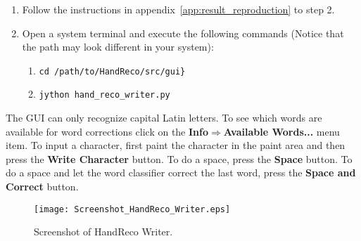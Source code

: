 \begin{enumerate}
 \item Follow the instructions in appendix~\ref{app:result_reproduction} to step 2.
 \item Open a system terminal and execute the following commands (Notice that the path may look different in your system):
 \begin{enumerate}
  \item \verb|cd /path/to/HandReco/src/gui}|
  \item \verb|jython hand_reco_writer.py|
 \end{enumerate}
\end{enumerate}

The GUI can only recognize capital Latin letters. To see which words are available for word corrections click on the \textbf{Info$\Rightarrow$Available Words...} menu item. To input a character, first paint the character in the paint area and then press the \textbf{Write Character} button. To do a space, press the \textbf{Space} button. To do a space and let the word classifier correct the last word, press the \textbf{Space and Correct} button.

    \begin{figure}[htb] 
      \begin{center}
	\leavevmode
	\texttt{[image: Screenshot\_HandReco\_Writer.eps]}%
      \end{center}
      \caption{Screenshot of HandReco Writer.}
      \label{fig:hand_reco_writer_screenshot}
    \end{figure}
